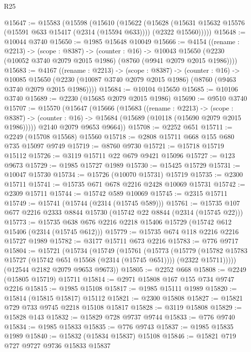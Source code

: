 \begin{lexlean}{R25}
\begin{coremodule}
@15647 := @15583
    (@15598
      (@15610
        (@15622
          (@15628
            (@15631 @15632 @15576 (@15591 @633 @15417 (@2314 (@15594 @633))))
            (@2322 @15560)))))
@15648 := @10044 @3740
@15650 := @1985 @15648 @10049
@15666 := @4154
    ((rename : @2213) ->
    (scope : @8387) ->
    (counter : @16) ->
    @10043 @15650 (@2230 (@10052 @3740 @2079 @2015 @1986) (@8760 (@9941 @2079 @2015 @1986))))
@15683 := @4167
    ((rename : @2213) ->
    (scope : @8387) ->
    (counter : @16) ->
    @10085 @15650 (@2230 (@10087 @3740 @2079 @2015 @1986) (@8760 (@9463 @3740 @2079 @2015 @1986))))
@15684 := @10104 @15650
@15685 := @10106 @3740
@15689 := @2230 (@15685 @2079 @2015 @1986)
@15690 := @9510 @3740
@15707 := @15570
    (@15647
      (@15666
        (@15683
          ((rename : @2213) ->
          (scope : @8387) ->
          (counter : @16) -> @15684 (@15689 (@10118 (@15690 @2079 @2015 @1986)))))
        @2140
        @2079
        @9653
        @9664))
@15708 := @2252 @651
@15711 := @2249 (@15708 @15568) @15560
@15718 := @2808 @15711 @668 @155 @680 @735 @15097 @9749
@15719 := @8760 @9730
@15721 := @15718 @15719 @15112
@15726 := @3119 @15711 @22 @679 @9421 @15096
@15727 := @123 @9673
@15729 := @1985 @15727 @1989
@15730 := @15425 @15729
@15731 := @10047 @15730
@15734 := @15726 (@10070 @15731) @15719
@15735 := @2300 @15711
@15741 := @15735 @671 @678 @2216 @2428 @10069 @15731
@15742 := @2309 @15711
@15744 := @15742 @589 @10069
@15745 := @2315 @15711
@15749 := @15741 (@15744 (@2314 (@15745 @589)))
@15761 := @15735 @107 @677 @2216 @2333 @8844 @15730 (@15742 @22 @8844 (@2314 (@15745 @22)))
@15773 := @15735 @638 @676 @2216 @2218 @15406 @15729 (@15742 @612 @15406 (@2314 (@15745 @612)))
@15779 := @15735 @674 @118 @2216 @2216 @15727 @1989
@15782 := @3177 @15711 @673 @2216
@15783 := @776 @9717
@15804 := @15721
    (@15734
      (@15749
        (@15761
          (@15773
            (@15779
              (@15782 @15783 @15727 (@15742 @651 @15568 (@2314 (@15745 @651))))
              (@2322 @15711)))))
      (@12544 @2182 @2079 @9653 @9673))
@15805 := @2252 @668
@15808 := @2249 (@15805 @15719) @15711
@15814 := @2971 @15808 @167 @155 @734 @9747 @2216
@15815 := @1985 @15108
@15817 := @1985 @15111 @1989
@15820 := @15814 (@15815 @15817) @15112
@15821 := @2300 @15808
@15827 := @15821 @729 @733 @9745 @2218 @15108 @15817
@15828 := @3119 @15808
@15829 := @15828 @143
@15832 := @15829 @728 @9737 @9744
@15833 := @776 @9740
@15834 := @1985 @15833
@15835 := @776 @9743
@15837 := @1985 @15835 @1989
@15840 := @15832 (@15834 @15837) @15108
@15846 := @15821 @719 @727 @9727 @9736 @15833 @15837

\end{coremodule}
\end{lexlean}
